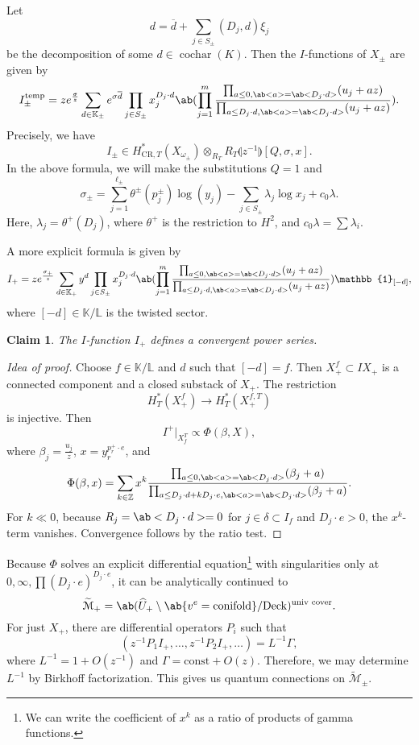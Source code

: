\documentclass[leqno, openany]{memoir}
\newtheorem{claim}[thm]{Claim}
\theoremstyle{definition}
\theoremstyle{remark}
\theoremstyle{plain}
\theoremstyle{definition}
\theoremstyle{remark}
\newcommand{\Z}{\mathbb{Z}}
\newcommand{\K}{\mathbb{K}}
\renewcommand{\L}{\mathbb{L}}
\newcommand{\mc}[1]{\mathcal{#1}}
\newcommand{\mr}[1]{\mathrm{#1}}
\newcommand{\on}[1]{\operatorname{#1}}
\newcommand{\ol}[1]{\overline{#1}}
\newcommand{\wt}[1]{\widetilde{#1}}
\newcommand{\wh}[1]{\widehat{#1}}
\begin{document}
Let 
\[ d = \ol{d} + \sum_{j \in S_{\pm}} (D_j, d) \xi_j \]
be  the decomposition of some $d \in \on{cochar}(K)$. Then the $I$-functions of $X_{\pm}$ are given by
\[ I_{\pm}^{\mr{temp}} = z e^{\frac{\sigma}{z}} \sum_{d \in \K_{\pm}}e^{\sigma \ol{d}} \prod_{j \in S_{\pm}} x_j^{D_j \cdot d} \ab(\prod_{j=1}^m \frac{\prod_{a\leq 0,\ab<a> = \ab<D_j\cdot d>}(u_j + az)}{\prod_{a \leq D_j \cdot d, \ab<a> = \ab<D_j\cdot d>}(u_j + az)}). \]
Precisely, we have
\[ I_{\pm} \in H_{\mr{CR}, T}^*(X_{\omega_{\pm}}) \otimes_{R_T} R_T\llparenthesis z^{-1} \rrparenthesis [Q,\sigma,x]. \]
In the above formula, we will make the substitutions $Q=1$ and
\[ \sigma_{\pm} = \sum_{j=1}^{\ell_{\pm}} \theta^{\pm}(p_j^{\pm}) \log(y_j) - \sum_{j \in S_{\pm}} \lambda_j \log x_j + c_0 \lambda. \]
Here, $\lambda_j = \theta^+(D_j)$, where $\theta^+$ is the restriction to $H^2$, and $c_0 \lambda = \sum \lambda_i$.

A more explicit formula is given by
\[ I_{+} = z e^{\frac{\sigma_+}{z}} \sum_{d \in \K_{+}}y^d \prod_{j \in S_{\pm}} x_j^{D_j \cdot d} \ab(\prod_{j=1}^m \frac{\prod_{a\leq 0,\ab<a> = \ab<D_j\cdot d>}(u_j + az)}{\prod_{a \leq D_j \cdot d, \ab<a> = \ab<D_j\cdot d>}(u_j + az)}) \mathbb{1}_{[-d]}, \]
where $[-d] \in \K/\L$ is the twisted sector.

\begin{claim}
    The $I$-function $I_+$ defines a convergent power series.
\end{claim}

\begin{proof}[Idea of proof]
    Choose $f \in \K/\L$ and $d$ such that $[-d] = f$. Then $X_+^f \subset IX_+$ is a connected component and a closed substack of $X_+$. The restriction
    \[ H_T^*(X_+^f) \to H_T^*(X_+^{f,T}) \]
    is injective. Then
    \[ I^+|_{X_f^T} \propto \Phi(\beta, X), \]
    where $\beta_j = \frac{u_j}{z}$, $x = y_r^{p_r^+ \cdot e}$, and
    \[ \Phi(\beta, x) = \sum_{k \in \Z} x^k \frac{\prod_{a\leq 0,\ab<a> = \ab<D_j\cdot d>}(\beta_j + a)}{\prod_{a \leq D_j \cdot d + k D_j \cdot e, \ab<a> = \ab<D_j\cdot d>}(\beta_j + a)}. \]
    For $k \ll 0$, because $R_j = \ab<D_j \cdot d> = 0$ for $j \in \delta \subset I_f$ and $D_j \cdot e > 0$, the $x^k$-term vanishes. Convergence follows by the ratio test.
\end{proof}

Because $\Phi$ solves an explicit differential equation\footnote{We can write the coefficient of $x^k$ as a ratio of products of gamma functions.} with singularities only at $0, \infty, \prod (D_j \cdot e)^{D_j \cdot e}$, it can be analytically continued to
\[ \wt{\mc{M}}_+ = \ab(\wh{U}_+ \setminus \ab\{v^e = \mr{conifold}\} / \mr{Deck})^{\text{univ cover}}. \]
For just $X_+$, there are differential operators $P_i$ such that
\[ ( z^{-1}P_1 I_+, \ldots, z^{-1}P_2 I_+ , \ldots) = L^{-1} \Gamma, \]
where $L^{-1} = 1 + O(z^{-1})$ and $\Gamma = \mr{const} + O(z)$. Therefore, we may determine $L^{-1}$ by Birkhoff factorization. This gives us quantum connections on $\wt{\mc{M}}_{\pm}$.
\end{document}
